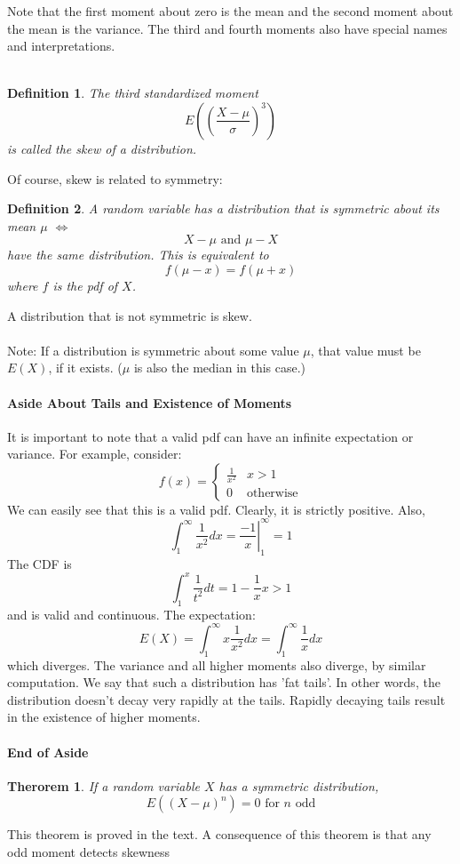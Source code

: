 \documentclass[12pt]{article} %
\newtheorem{defn}{Definition}
\newtheorem{thm}{Therorem}
\begin{document}
Note that the first moment about zero is the mean and the second moment about the mean is the variance. The third and fourth moments also have special names and interpretations.\\\\
\begin{defn}
The third standardized moment 
$$E(\left(\frac{X-\mu}{\sigma}\right)^3)$$
is called the \emph{skew} of a distribution.
\end{defn}
Of course, skew is related to symmetry:
\begin{defn}
A random variable has a distribution that is symmetric about its mean $\mu$ $\iff$
$$X-\mu \textrm{ and } \mu-X$$
have the same distribution. This is equivalent to 
$$f(\mu-x) = f(\mu+x)$$
where $f$ is the pdf of $X$.
\end{defn}
A distribution that is not symmetric is skew.\\\\
Note: If a distribution is symmetric about some value $\mu$, that value must be $E(X)$, if it exists. ($\mu$ is also the median in this case.)
\paragraph{Aside About Tails and Existence of Moments}
It is important to note that a valid pdf can have an infinite expectation or variance. For example, consider:
$$f(x) =\left\{\begin{matrix}\frac{1}{x^2} & x>1\\0&\textrm{otherwise}\end{matrix}\right.$$
We can easily see that this is a valid pdf. Clearly, it is strictly positive. 
Also,
$$\int_1^\infty \frac{1}{x^2}dx = \left.\frac{-1}{x}\right\rvert_1^\infty = 1$$
The CDF is
$$\int_1^x \frac1{t^2}dt = 1-\frac1{x} x>1$$
and is valid and continuous. The expectation:
$$E(X) = \int_1^\infty x \frac1{x^2}dx = \int_1^\infty \frac1{x}dx$$
which diverges. The variance and all higher moments also diverge, by similar computation. We say that such a distribution has 'fat tails'. In other words, the distribution doesn't decay very rapidly at the tails. Rapidly decaying tails result in the existence of higher moments.
\paragraph{End of Aside}


\begin{thm}
If a random variable $X$ has a symmetric distribution,
$$E(\left(X-\mu\right)^n) = 0 \textrm{ for } n \textrm{ odd}$$
\end{thm}

This theorem is proved in the text. A consequence of this theorem is that any odd moment detects skewness
\end{document}

